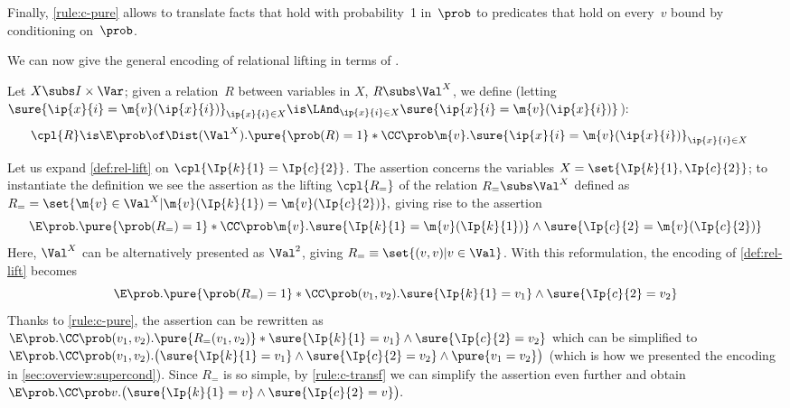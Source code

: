 Finally, \cref{rule:c-pure} allows to translate facts that hold with probability~1 in~$\prob$ to predicates that hold on every~$v$ bound by conditioning on~$\prob$.



We can now give the general encoding of relational lifting
in terms of \supercond.

\begin{definition}
\label{def:rel-lift}
  Let $X \subs I \times \Var$;
  given a relation~$R$ between variables in $X$,
  \ie $R \subs \Val^{X}$,
  we define
  (letting
  $
    \sure{\ip{x}{i} = \m{v}(\ip{x}{i})}_{\ip{x}{i}\in X} \is
      \LAnd_{\ip{x}{i}\in X}
        \sure{\ip{x}{i} = \m{v}(\ip{x}{i})}
  $):
  \begin{align*}
    \cpl{R} &\is
      \E \prob \of \Dist(\Val^{X}).
        \pure{\prob(R) = 1} *
        \CC\prob \m{v}.
          \sure{\ip{x}{i} = \m{v}(\ip{x}{i})}_{\ip{x}{i}\in X}
  \end{align*}
\end{definition}

\begin{example}
Let us expand \cref{def:rel-lift} on
$\cpl{ \Ip{k}{1} = \Ip{c}{2} }$.
The assertion concerns the variables
$X = \set{\Ip{k}{1}, \Ip{c}{2}}$;
to instantiate the definition we see the assertion as
the lifting $ \cpl{R_{=}} $
of the relation $ R_{=} \subs \Val^X $
defined as
$
  R_{=} =
    \set{ \m{v} \in \Val^{X}
        | \m{v}(\Ip{k}{1}) = \m{v}(\Ip{c}{2}) }
  ,
$
giving rise to the assertion
\[
  \E \prob.
    \pure{\prob(R_{=}) = 1} *
    \CC\prob \m{v}.
      \sure{\Ip{k}{1} = \m{v}(\Ip{k}{1})}
      \land
      \sure{\Ip{c}{2} = \m{v}(\Ip{c}{2})}
\]
Here, $\Val^X$ can be alternatively presented as
$ \Val^2 $, giving
$ R_{=} \equiv \set{(v,v) | v \in \Val} $.
With this reformulation, the encoding of \cref{def:rel-lift} becomes
\[
  \E \prob.
    \pure{\prob(R_{=}) = 1} *
    \CC\prob (v_1,v_2).
      \sure{\Ip{k}{1} = v_1}
      \land
      \sure{\Ip{c}{2} = v_2}
\]
Thanks to \ref{rule:c-pure}, the assertion can be rewritten as
$
  \E \prob.
    \CC\prob (v_1,v_2).
      \pure{R_{=}(v_1,v_2)} *
      \sure{\Ip{k}{1} = v_1}
      \land
      \sure{\Ip{c}{2} = v_2}
$
which can be simplified to
$
  \E \prob.
  \CC\prob (v_1,v_2).\bigl(
    \sure{\Ip{k}{1} = v_1} \land
    \sure{\Ip{c}{2} = v_2} \land
    \pure{v_1=v_2}
  \bigr)
$
(which is how we presented the encoding in \cref{sec:overview:supercond}).
Since $R_{=}$ is so simple,
by \ref{rule:c-transf} we can simplify the assertion even further and obtain
$
  \E \prob.
  \CC\prob v.\bigl(
    \sure{\Ip{k}{1} = v} \land
    \sure{\Ip{c}{2} = v}
  \bigr).
$
\end{example}

